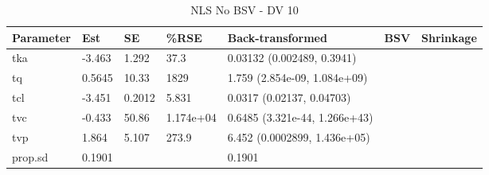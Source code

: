 \begin{table}
\centering\centering
\caption{NLS No BSV - DV 10}
\centering
\fontsize{8}{10}\selectfont
\begin{tabular}[t]{lllllll}
\toprule
\textbf{Parameter} & \textbf{Est} & \textbf{SE} & \textbf{\%RSE} & \textbf{Back-transformed} & \textbf{BSV} & \textbf{Shrinkage}\\
\midrule
tka & -3.463 & 1.292 & 37.3 & 0.03132 (0.002489, 0.3941) &  & \\
\midrule
tq & 0.5645 & 10.33 & 1829 & 1.759 (2.854e-09, 1.084e+09) &  & \\
\midrule
tcl & -3.451 & 0.2012 & 5.831 & 0.0317 (0.02137, 0.04703) &  & \\
\midrule
tvc & -0.433 & 50.86 & 1.174e+04 & 0.6485 (3.321e-44, 1.266e+43) &  & \\
\midrule
tvp & 1.864 & 5.107 & 273.9 & 6.452 (0.0002899, 1.436e+05) &  & \\
\midrule
prop.sd & 0.1901 &  &  & 0.1901 &  & \\
\bottomrule
\end{tabular}
\end{table}